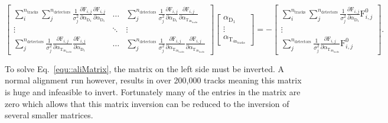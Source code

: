\begin{dmath}
  \begin{bmatrix}
    \sum_i^{n_{\mathrm{tracks}}} \sum_j^{n_{\mathrm{detectors}}}
      \frac{1}{\sigma^2_j} \frac{\partial \mathrm{F}_{i,j}}{\partial
        \alpha_{\mathrm{D_1}}}\frac{\partial \mathrm{F}_{i,j}}{\partial
        \alpha_{\mathrm{D_1}}}
      & \dots &
      \sum_j^{n_{\mathrm{detectors}}}
      \frac{1}{\sigma^2_j}\frac{\partial \mathrm{F}_{i,j}}{\partial
        \alpha_{\mathrm{D_1}}}\frac{\partial \mathrm{F}_{i,j}}{\partial
        \alpha_{\mathrm{T_{4\mathrm{n}_{\mathrm{tracks}}}}}} \\
      \vdots & \ddots & \vdots \\
      \sum_j^{n_{\mathrm{detectors}}}
      \frac{1}{\sigma^2_j}\frac{\partial \mathrm{F}_{i,j}}{\partial
        \alpha_{\mathrm{T_{4\mathrm{n}_{\mathrm{tracks}}}}}}\frac{\partial
        \mathrm{F}_{i,j}}{\partial \alpha_{\mathrm{D_1}}} & \dots &
      \sum_j^{n_{\mathrm{detectors}}} \frac{1}{\sigma^2_j}\frac{\partial
        \mathrm{F}_{i,j}}{\partial
        \alpha_{\mathrm{T_{4\mathrm{n}_{\mathrm{tracks}}}}}}\frac{\partial
        \mathrm{F}_{i,j}}{\partial
        \alpha_{\mathrm{T_{4\mathrm{n}_{\mathrm{tracks}}}}}}
  \end{bmatrix}
  \begin{bmatrix}
    \alpha_{\mathrm{D_1}} \\
    \vdots \\
    \alpha_{\mathrm{T_{4\mathrm{n}_{\mathrm{tracks}}}}}
  \end{bmatrix}
  = -
  \begin{bmatrix}
    \sum_i^{n_{\mathrm{tracks}}} \sum_j^{n_{\mathrm{detectors}}}
      \frac{1}{\sigma^2_j}\frac{\partial \mathrm{F}_{i,j}}{\partial
        \alpha_{\mathrm{D_1}}} \mathrm{F}_{i,j}^0 \\
      \vdots \\
      \sum_j^{n_{\mathrm{detectors}}}
    \frac{1}{\sigma^2_j}\frac{\partial \mathrm{F}_{i,j}}{\partial
      \alpha_{\mathrm{T_{4\mathrm{n}_{\mathrm{tracks}}}}}} \mathrm{F}_{i,j}^0
  \end{bmatrix}.
  \label{equ::aliMatrix}
\end{dmath}    

\noindent
To solve Eq.~\ref{equ::aliMatrix}, the matrix on the left side must be inverted.
A normal alignment run however, results in over 200,000 tracks meaning this
matrix is huge and infeasible to invert.  Fortunately many of the entries in the
matrix are zero which allows that this matrix inversion can be reduced to
the inversion of several smaller matrices.

